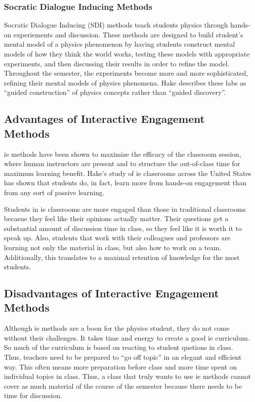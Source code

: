 \subsubsection{Socratic Dialogue Inducing Methods}

Socratic Dialogue Inducing (SDI) methods teach students physics through hands-on experiements and discussion. These methods are designed to build student's mental model of a physics phenomenon by having students construct mental models of how they think the world works, testing these models with appropriate experiments, and then discussing their results in order to refine the model. Throughout the semester, the experiments become more and more sophisticated, refining their mental models of physics phenomena. Hake describes these labs as ``guided construction'' of physics concepts rather than ``guided discovery''\cite{hake1992}.

\subsection{Advantages of Interactive Engagement Methods}

\gls{ie} methods have been shown to maximize the efficacy of the classroom session, where human instructors are present and to structure the out-of-class time for maximum learning benefit. Hake's study of \gls{ie} classrooms across the United States has shown that students do, in fact, learn more from hands-on engagement than from any sort of passive learning.

Students in \gls{ie} classrooms are more engaged than those in traditional classrooms becasue they feel like their opinions actually matter. Their questions get a substantial amount of discussion time in class, so they feel like it is worth it to speak up. Also, students that work with their colleagues and professors are learning not only the material in class, but also how to work on a team. Additionally, this translates to a maximal retention of knowledge for the most students\cite{novak1999}.

\subsection{Disadvantages of Interactive Engagement Methods}

Although \gls{ie} methods are a boon for the physics student, they do not come without their challenges. It takes time and energy to create a good \gls{ie} curriculum. So much of the curriculum is based on reacting to student quetions in class. Thus, teachers need to be prepared to ``go off topic'' in an elegant and efficient way. This often means more preparation before class and more time spent on individual topics in class. Thus, a class that truly wants to use \gls{ie} methods cannot cover as much material of the course of the semester because there needs to be time for discussion.

